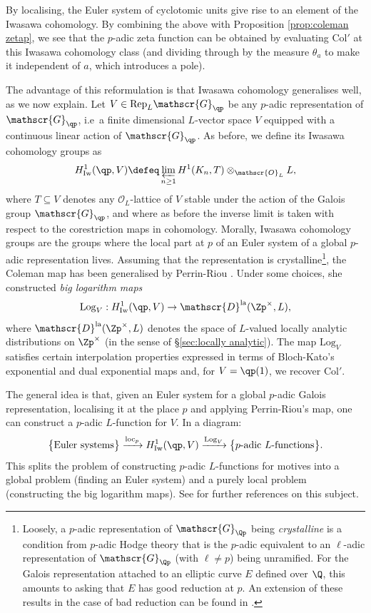 \documentclass[a4paper,10pt, english, reqno]{smfart}
\numberwithin{equation}{section}
\begin{document}
By localising, the Euler system of cyclotomic units give rise to an element of the Iwasawa cohomology. By combining the above with Proposition \ref{prop:coleman zetap}, we see that the $p$-adic zeta function can be obtained by evaluating $\mathrm{Col}'$ at this Iwasawa cohomology class (and dividing through by the measure $\theta_a$ to make it independent of $a$, which introduces a pole). 

The advantage of this reformulation is that Iwasawa cohomology generalises well, as we now explain. Let $V \in \mathrm{Rep}_L \mathscr{G}_{\qp}$ be any $p$-adic representation of $\mathscr{G}_{\qp}$, i.e\ a finite dimensional $L$-vector space $V$ equipped with a continuous linear action of $\mathscr{G}_{\qp}$. As before, we define its Iwasawa cohomology groups as
\[ 
H^1_{\rm Iw}(\qp, V) \defeq \varprojlim_{n \geq 1} H^1(K_n, T) \otimes_{\mathscr{O}_L} L, 
\] 
where $T \subseteq V$ denotes any $\mathscr{O}_L$-lattice of $V$ stable under the action of the Galois group $\mathscr{G}_{\qp}$, and where as before the inverse limit is taken with respect to the corestriction maps in cohomology. Morally, Iwasawa cohomology groups are the groups where the local part at $p$ of an Euler system of a global $p$-adic representation lives. Assuming that the representation is crystalline\footnote{Loosely, a $p$-adic representation of $\mathscr{G}_{\Qp}$ being \emph{crystalline} is a condition from $p$-adic Hodge theory that is the $p$-adic equivalent to an $\ell$-adic representation of $\mathscr{G}_{\Qp}$ (with $\ell \neq p$) being unramified. For the Galois representation attached to an elliptic curve $E$ defined over $\Q$, this amounts to asking that $E$ has good reduction at $p$. An extension of these results in the case of bad reduction can be found in \cite{RodriguesPhiGamma}.}, the Coleman map has been generalised by Perrin-Riou \cite{PR}. Under some choices, she constructed \emph{big logarithm maps}
\[ \mathrm{Log}_V : H^1_{\rm Iw}(\qp, V) \to \mathscr{D}^{\mathrm{la}}(\Zp^\times, L), \] 
where $\mathscr{D}^{\mathrm{la}}(\Zp^\times, L)$ denotes the space of $L$-valued  locally analytic distributions on $\Zp^\times$ (in the sense of \S\ref{sec:locally analytic}). The map $\mathrm{Log}_V$ satisfies certain interpolation properties expressed in terms of Bloch-Kato's exponential and dual exponential maps and, for $V = \qp(1)$, we recover $\mathrm{Col}'$.

The general idea is that, given an Euler system for a global $p$-adic Galois representation, localising it at the place $p$ and applying Perrin-Riou's map, one can construct a $p$-adic $L$-function for $V$. In a diagram:
\[ \big\{ \text{Euler systems} \big\} \xrightarrow{\mathrm{loc}_p} H^1_{\rm Iw}(\qp, V) \xrightarrow{\mathrm{Log}_V} \big\{ p\text{-adic $L$-functions} \big\}. \] This splits the problem of constructing $p$-adic $L$-functions for motives into a global problem (finding an Euler system) and a purely local problem (constructing the big logarithm maps). See \cite{ColmezFonctL} for further references on this subject. 
\end{document}
